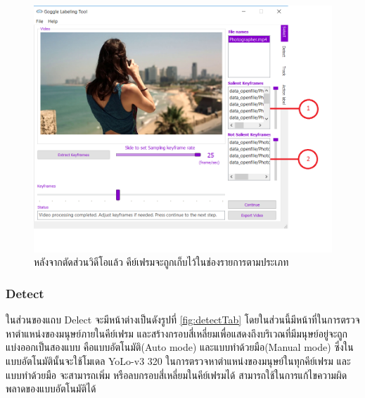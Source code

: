 \begin{figure}[!ht]
    \centering
    \includegraphics[width=1\textwidth]{chapter3/images/3_3/SelectTab_sampled.png}
    \caption{หลังจากตัดส่วนวิดีโอแล้ว คีย์เฟรมจะถูกเก็บไว้ในช่องรายการตามประเภท}
    \label{fig:SelectTab_sampled}
\end{figure}
\clearpage
\subsubsection{Detect}
ในส่วนของแถบ Delect จะมีหน้าต่างเป็นดังรูปที่ \ref{fig:detectTab} โดยในส่วนนี้มีหน้าที่ในการตรวจหาตำแหน่งของมนุษย์ภายในคีย์เฟรม
และสร้างกรอบสี่เหลี่ยมเพื่อแสดงถึงบริเวณที่มีมนุษย์อยู่จะถูกแบ่งออกเป็นสองแบบ 
คือแบบอัตโนมัติ(Auto mode) และแบบทำด้วยมือ(Manual mode) 
ซึ่งในแบบอัตโนมัตินั้นจะใช้โมเดล YoLo-v3 320 ในการตรวจหาตำแหน่งของมนุษย์ในทุกคีย์เฟรม
และแบบทำด้วยมือ จะสามารถเพิ่ม หรือลบกรอบสี่เหลี่ยมในคีย์เฟรมได้ สามารถใช้ในการแก้ไขความผิดพลาดของแบบอัตโนมัติได้

